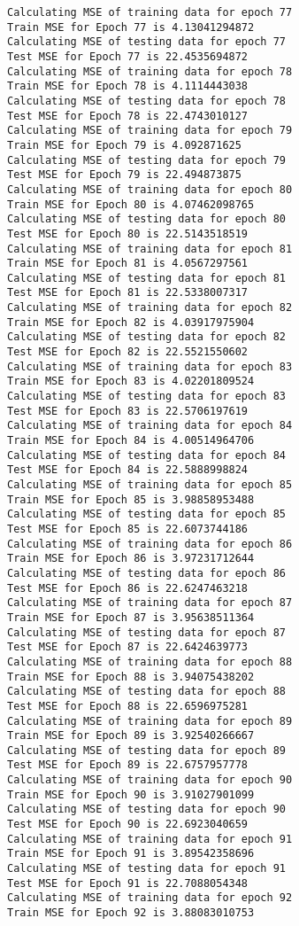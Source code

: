 \documentclass{article}
\begin{document}
\begin{Verbatim}[commandchars=\\\{\}]
Calculating MSE of training data for epoch 77
Train MSE for Epoch 77 is 4.13041294872
Calculating MSE of testing data for epoch 77
Test MSE for Epoch 77 is 22.4535694872
Calculating MSE of training data for epoch 78
Train MSE for Epoch 78 is 4.1114443038
Calculating MSE of testing data for epoch 78
Test MSE for Epoch 78 is 22.4743010127
Calculating MSE of training data for epoch 79
Train MSE for Epoch 79 is 4.092871625
Calculating MSE of testing data for epoch 79
Test MSE for Epoch 79 is 22.494873875
Calculating MSE of training data for epoch 80
Train MSE for Epoch 80 is 4.07462098765
Calculating MSE of testing data for epoch 80
Test MSE for Epoch 80 is 22.5143518519
Calculating MSE of training data for epoch 81
Train MSE for Epoch 81 is 4.0567297561
Calculating MSE of testing data for epoch 81
Test MSE for Epoch 81 is 22.5338007317
Calculating MSE of training data for epoch 82
Train MSE for Epoch 82 is 4.03917975904
Calculating MSE of testing data for epoch 82
Test MSE for Epoch 82 is 22.5521550602
Calculating MSE of training data for epoch 83
Train MSE for Epoch 83 is 4.02201809524
Calculating MSE of testing data for epoch 83
Test MSE for Epoch 83 is 22.5706197619
Calculating MSE of training data for epoch 84
Train MSE for Epoch 84 is 4.00514964706
Calculating MSE of testing data for epoch 84
Test MSE for Epoch 84 is 22.5888998824
Calculating MSE of training data for epoch 85
Train MSE for Epoch 85 is 3.98858953488
Calculating MSE of testing data for epoch 85
Test MSE for Epoch 85 is 22.6073744186
Calculating MSE of training data for epoch 86
Train MSE for Epoch 86 is 3.97231712644
Calculating MSE of testing data for epoch 86
Test MSE for Epoch 86 is 22.6247463218
Calculating MSE of training data for epoch 87
Train MSE for Epoch 87 is 3.95638511364
Calculating MSE of testing data for epoch 87
Test MSE for Epoch 87 is 22.6424639773
Calculating MSE of training data for epoch 88
Train MSE for Epoch 88 is 3.94075438202
Calculating MSE of testing data for epoch 88
Test MSE for Epoch 88 is 22.6596975281
Calculating MSE of training data for epoch 89
Train MSE for Epoch 89 is 3.92540266667
Calculating MSE of testing data for epoch 89
Test MSE for Epoch 89 is 22.6757957778
Calculating MSE of training data for epoch 90
Train MSE for Epoch 90 is 3.91027901099
Calculating MSE of testing data for epoch 90
Test MSE for Epoch 90 is 22.6923040659
Calculating MSE of training data for epoch 91
Train MSE for Epoch 91 is 3.89542358696
Calculating MSE of testing data for epoch 91
Test MSE for Epoch 91 is 22.7088054348
Calculating MSE of training data for epoch 92
Train MSE for Epoch 92 is 3.88083010753

\end{Verbatim}
\end{document}
